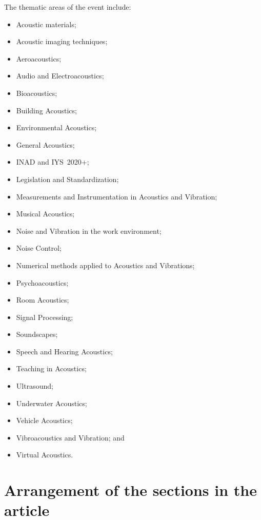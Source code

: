\documentclass[12pt, a4paper, twoside, twocolumn]{article}
\begin{document}
The thematic areas of the event include:
%
\begin{itemize}[noitemsep,topsep=0ex] \itemsep=1.2pt
\item Acoustic materials;
\item Acoustic imaging techniques;
\item Aeroacoustics;
\item Audio and Electroacoustics;
\item Bioacoustics;
\item Building Acoustics;
\item Environmental Acoustics;
\item General Acoustics;
\item INAD and IYS~2020+;
\item Legislation and Standardization;
\item Measurements and Instrumentation in Acoustics and Vibration;
\item Musical Acoustics;
\item Noise and Vibration in the work environment;
\item Noise Control;
\item Numerical methods applied to Acoustics and Vibrations;
\item Psychoacoustics;
\item Room Acoustics;
\item Signal Processing;
\item Soundscapes;
\item Speech and Hearing Acoustics;
\item Teaching in Acoustics;
\item Ultrasound;
\item Underwater Acoustics;
\item Vehicle Acoustics;
\item Vibroacoustics and Vibration; and
\item Virtual Acoustics.
\end{itemize}

\section{Arrangement of the sections in the article}
\end{document}
